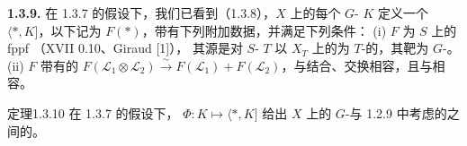 \textbf{1.3.9.} 在 1.3.7 的假设下，我们已看到（1.3.8），$X$ 上的每个 $G$- $K$ 定义一个 $\langle *,K]$，以下记为 $F(*)$，带有下列附加数据，并满足下列条件：
(i) $F$ 为 $S$ 上的 fppf （XVII 0.10、Giraud [1]），
其源是对 $S$- $T$ 以 $X_T$ 上的为 $T$-的，其靶为 $G$-。
(ii)  $F$ 带有的 $F(\mathscr L_1\otimes\mathscr L_2)\xrightarrow\sim F(\mathscr L_1)+F(\mathscr L_2)$，与结合、交换相容，且与相容。
\begin{SGAresult}{定理}{1.3.10}
在 1.3.7 的假设下， $\Phi:K\mapsto\langle *,K]$ 给出 $X$ 上的 $G$-与 1.2.9 中考虑的之间的。
\end{SGAresult}

